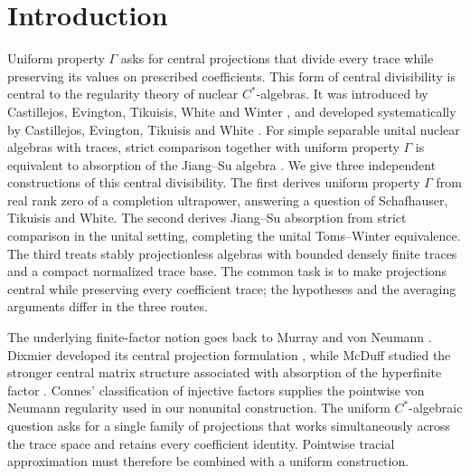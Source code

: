 \section{Introduction}\label{sec:introduction}

Uniform property $\Gamma$ asks for central projections that divide every
trace while preserving its values on prescribed coefficients. This form of
central divisibility is central to the regularity theory of nuclear
$C^*$-algebras. It was introduced by Castillejos, Evington, Tikuisis, White
and Winter \cite[Definition~2.1]{CETWW}, and developed systematically by
Castillejos, Evington, Tikuisis and White \cite{CETW}. For simple separable
unital nuclear algebras with traces, strict comparison together with uniform
property $\Gamma$ is equivalent to absorption of the Jiang--Su algebra
\cite[Theorem~5.6]{CETW}. We give three independent constructions of this central divisibility.
The first derives uniform property $\Gamma$ from real rank zero of a
completion ultrapower, answering a question of Schafhauser, Tikuisis and
White. The second derives Jiang--Su absorption from strict comparison
in the unital setting, completing the unital Toms--Winter equivalence.
The third treats stably projectionless algebras with bounded densely
finite traces and a compact normalized trace base. The common task is
to make projections central while preserving every coefficient trace;
the hypotheses and the averaging arguments differ in the three routes.

The underlying finite-factor notion goes back to Murray and von Neumann
\cite{MurrayVonNeumann1943}. Dixmier developed its central projection
formulation \cite{Dixmier1969}, while McDuff studied the stronger central
matrix structure associated with absorption of the hyperfinite factor
\cite{McDuff1970}. Connes' classification of injective factors
\cite{Connes} supplies the pointwise von Neumann regularity used in our
nonunital construction. The uniform $C^*$-algebraic question asks for a
single family of projections that works simultaneously across the trace
space and retains every coefficient identity. Pointwise tracial
approximation must therefore be combined with a uniform construction.

